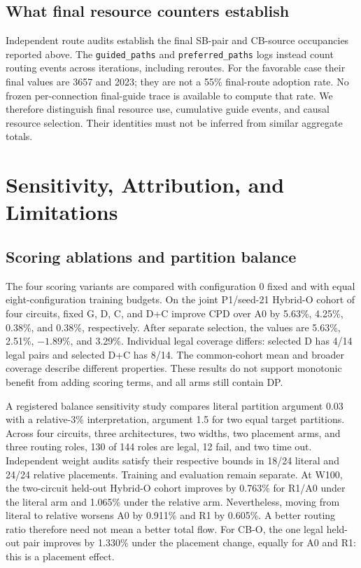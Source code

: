 \documentclass[conference,10pt]{IEEEtran}
\begin{document}
\subsection{What final resource counters establish}
Independent route audits establish the final SB-pair and CB-source occupancies reported above. The \texttt{guided\_paths} and \texttt{preferred\_paths} logs instead count routing events across iterations, including reroutes. For the favorable case their final values are 3657 and 2023; they are not a 55\% final-route adoption rate. No frozen per-connection final-guide trace is available to compute that rate. We therefore distinguish final resource use, cumulative guide events, and causal resource selection. Their identities must not be inferred from similar aggregate totals.

\clearpage
\section{Sensitivity, Attribution, and Limitations}
\subsection{Scoring ablations and partition balance}
The four scoring variants are compared with configuration 0 fixed and with equal eight-configuration training budgets. On the joint P1/seed-21 Hybrid-O cohort of four circuits, fixed G, D, C, and D+C improve CPD over A0 by 5.63\%, 4.25\%, 0.38\%, and 0.38\%, respectively. After separate selection, the values are 5.63\%, 2.51\%, $-1.89\%$, and 3.29\%. Individual legal coverage differs: selected D has 4/14 legal pairs and selected D+C has 8/14. The common-cohort mean and broader coverage describe different properties. These results do not support monotonic benefit from adding scoring terms, and all arms still contain DP.

A registered balance sensitivity study compares literal partition argument 0.03 with a relative-3\% interpretation, argument 1.5 for two equal target partitions. Across four circuits, three architectures, two widths, two placement arms, and three routing roles, 130 of 144 roles are legal, 12 fail, and two time out. Independent weight audits satisfy their respective bounds in 18/24 literal and 24/24 relative placements. Training and evaluation remain separate. At W100, the two-circuit held-out Hybrid-O cohort improves by 0.763\% for R1/A0 under the literal arm and 1.065\% under the relative arm. Nevertheless, moving from literal to relative worsens A0 by 0.911\% and R1 by 0.605\%. A better routing ratio therefore need not mean a better total flow. For CB-O, the one legal held-out pair improves by 1.330\% under the placement change, equally for A0 and R1: this is a placement effect.
\end{document}

